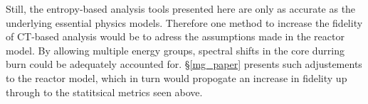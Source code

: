 Still, the entropy-based analysis tools presented here are only as accurate as the 
underlying essential physics models.  Therefore one method to increase the fidelity of
CT-based analysis would be to adress the assumptions made in the reactor model.  By allowing
multiple energy groups, spectral shifts in the core durring burn could be adequately accounted for.  
\S \ref{mg_paper} presents such adjustements to the reactor model, which in turn would propogate 
an increase in fidelity up through to the statitsical metrics seen above.
 
